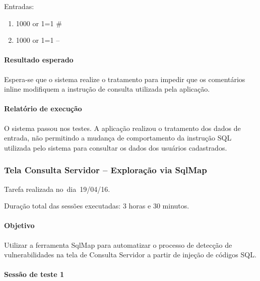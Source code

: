 \documentclass[
    12pt,               %
    openright,          %
    oneside,            %
    a4paper,            %
    section=TITLE,     %
    english,            %
    french,             %
    spanish,            %
    brazil              %
    ]{abntex2}
\begin{document}
Entradas:



\begin{enumerate}[start=1]
	
\item 1000 or 1=1 \#~
	
\item 1000 or 1=1 --

\end{enumerate}


\paragraph*{Resultado esperado}

Espera-se que o sistema realize o tratamento para impedir que os comentários inline modifiquem a instrução de consulta utilizada pela aplicação.



\paragraph*{Relatório de execução}

O sistema passou nos testes. A aplicação realizou o tratamento dos dados de entrada, não permitindo a mudança de comportamento da instrução SQL utilizada pelo sistema para consultar os dados dos usuários cadastrados.





\subsubsection*{Tela Consulta Servidor -- Exploração via SqlMap}

Tarefa realizada no~dia~19/04/16.


Duração total das sessões executadas: 3 horas e 30 minutos.



\paragraph*{Objetivo}

Utilizar a ferramenta SqlMap para automatizar o processo de detecção de vulnerabilidades na tela de Consulta Servidor a partir de injeção de códigos SQL.



\paragraph*{Sessão de teste 1}
\end{document}
